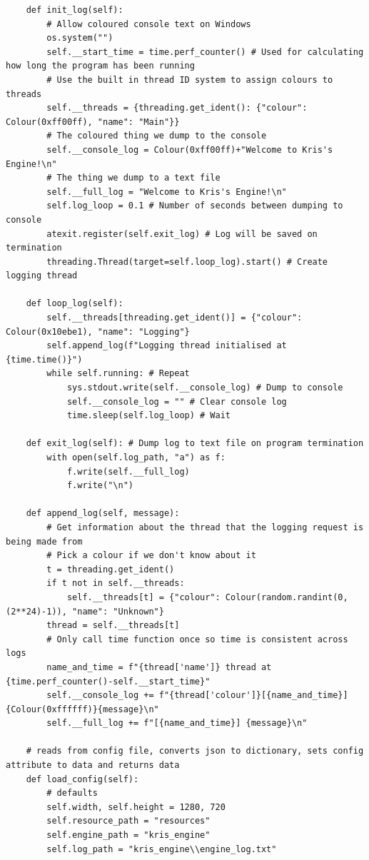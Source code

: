 \documentclass{report}
\begin{document}
\begin{verbatim}
    def init_log(self):
        # Allow coloured console text on Windows
        os.system("")
        self.__start_time = time.perf_counter() # Used for calculating how long the program has been running
        # Use the built in thread ID system to assign colours to threads
        self.__threads = {threading.get_ident(): {"colour": Colour(0xff00ff), "name": "Main"}}
        # The coloured thing we dump to the console
        self.__console_log = Colour(0xff00ff)+"Welcome to Kris's Engine!\n"
        # The thing we dump to a text file
        self.__full_log = "Welcome to Kris's Engine!\n"
        self.log_loop = 0.1 # Number of seconds between dumping to console
        atexit.register(self.exit_log) # Log will be saved on termination
        threading.Thread(target=self.loop_log).start() # Create logging thread

    def loop_log(self):
        self.__threads[threading.get_ident()] = {"colour": Colour(0x10ebe1), "name": "Logging"}
        self.append_log(f"Logging thread initialised at {time.time()}")
        while self.running: # Repeat
            sys.stdout.write(self.__console_log) # Dump to console
            self.__console_log = "" # Clear console log
            time.sleep(self.log_loop) # Wait

    def exit_log(self): # Dump log to text file on program termination
        with open(self.log_path, "a") as f:
            f.write(self.__full_log)
            f.write("\n")

    def append_log(self, message):
        # Get information about the thread that the logging request is being made from
        # Pick a colour if we don't know about it
        t = threading.get_ident()
        if t not in self.__threads:
            self.__threads[t] = {"colour": Colour(random.randint(0, (2**24)-1)), "name": "Unknown"}
        thread = self.__threads[t]
        # Only call time function once so time is consistent across logs
        name_and_time = f"{thread['name']} thread at {time.perf_counter()-self.__start_time}"
        self.__console_log += f"{thread['colour']}[{name_and_time}] {Colour(0xffffff)}{message}\n"
        self.__full_log += f"[{name_and_time}] {message}\n"

    # reads from config file, converts json to dictionary, sets config attribute to data and returns data
    def load_config(self):
        # defaults
        self.width, self.height = 1280, 720
        self.resource_path = "resources"
        self.engine_path = "kris_engine"
        self.log_path = "kris_engine\\engine_log.txt"


\end{verbatim}
\end{document}

